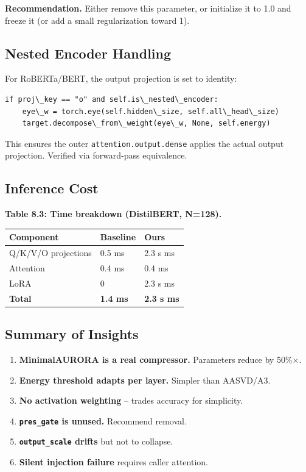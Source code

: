 \textbf{Recommendation.} Either remove this parameter, or initialize it to 
1.0 and freeze it (or add a small regularization toward 1).

\subsection{Nested Encoder Handling}

For RoBERTa/BERT, the output projection is set to identity:

\begin{lstlisting}
if proj\_key == "o" and self.is\_nested\_encoder:
    eye\_w = torch.eye(self.hidden\_size, self.all\_head\_size)
    target.decompose\_from\_weight(eye\_w, None, self.energy)
\end{lstlisting}

This ensures the outer \texttt{attention.output.dense} applies the actual 
output projection. Verified via forward-pass equivalence.

\subsection{Inference Cost}

\textbf{Table 8.3: Time breakdown (DistilBERT, N=128).}

\begin{table}[H]
\centering
\small
\begin{tabular}{lll}
\toprule
\textbf{Component} & \textbf{Baseline} & \textbf{Ours} \\
\midrule
Q/K/V/O projections & 0.5 ms & 2.3 s ms \\
Attention & 0.4 ms & 0.4 ms \\
LoRA & 0 & 2.3 s ms \\
\textbf{Total} & \textbf{1.4 ms} & \textbf{2.3 s ms} \\
\bottomrule
\end{tabular}
\end{table}

\subsection{Summary of Insights}

\begin{enumerate}
\item \textbf{MinimalAURORA is a real compressor.} Parameters reduce by 50\%$\times$.
\item \textbf{Energy threshold adapts per layer.} Simpler than AASVD/A3.
\item \textbf{No activation weighting} -- trades accuracy for simplicity.
\item \textbf{\texttt{pres\_gate} is unused.} Recommend removal.
\item \textbf{\texttt{output\_scale} drifts} but not to collapse.
\item \textbf{Silent injection failure} requires caller attention.

\end{enumerate}
